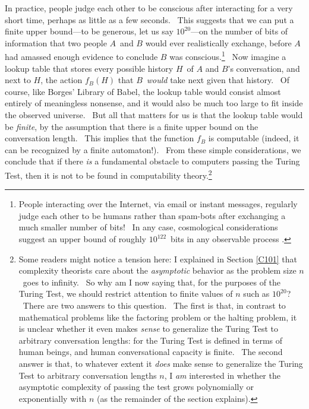 \documentclass[11pt,onecolumn]{article}%
\begin{document}
In practice, people judge each other to be conscious after interacting for a
very short time, perhaps as little as a few seconds. \ This suggests that we
can put a finite upper bound---to be generous, let us say $10^{20}$---on the
number of bits of information that two people $A$\ and $B$ would ever
realistically exchange, before $A$ had amassed enough evidence to conclude $B$
was conscious.\footnote{People interacting over the Internet, via email or
instant messages, regularly judge each other to be humans rather than
spam-bots after exchanging a much smaller number of bits! \ In any case,
cosmological considerations suggest an upper bound of roughly $10^{122}$\ bits
in any observable process \cite{bousso:vac}.} \ Now imagine a lookup table
that stores every possible history $H$\ of $A$ and $B$'s conversation, and
next to $H$, the action $f_{B}\left(  H\right)  $ that $B$\ \textit{would}
take next given that history. \ Of course, like Borges' Library of Babel, the
lookup table would consist almost entirely of meaningless nonsense, and it
would also be much too large to fit inside the observed universe. \ But all
that matters for us is that the lookup table would be \textit{finite}, by the
assumption that there is a finite upper bound on the conversation length.
\ This implies that the function $f_{B}$ is computable (indeed, it can be
recognized by a finite automaton!). \ From these simple considerations, we
conclude that if there \textit{is} a fundamental obstacle to computers passing
the Turing Test, then it is not to be found in computability
theory.\footnote{Some readers might notice a tension here: I explained in
Section \ref{C101} that complexity theorists care about the
\textit{asymptotic} behavior as the problem size $n$\ goes to infinity. \ So
why am I now saying that, for the purposes of the Turing Test, we should
restrict attention to finite values of $n$ such as $10^{20}$? \ There are two
answers to this question. \ The first is that, in contrast to mathematical
problems like the factoring problem or the halting problem, it is unclear
whether it even makes \textit{sense} to generalize the Turing Test to
arbitrary conversation lengths: for the Turing Test is defined in terms of
human beings, and human conversational capacity is finite. \ The second answer
is that, to whatever extent it \textit{does} make sense to generalize the
Turing Test to arbitrary conversation lengths $n$, I \textit{am} interested in
whether the asymptotic complexity of passing the test grows polynomially or
exponentially with $n$ (as the remainder of the section explains).}
\end{document}
